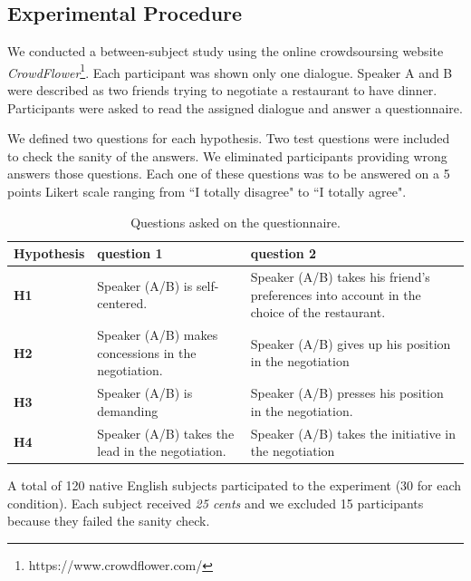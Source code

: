 \documentclass{llncs}
\begin{document}
			
			\subsection{Experimental Procedure}
			
			We conducted a between-subject study using the online crowdsoursing website \emph{CrowdFlower}\footnote{https://www.crowdflower.com/}. 
			Each participant was shown only one dialogue. Speaker A and B were described as two friends trying to negotiate a restaurant to have dinner. %
			Participants were asked to read the assigned dialogue and answer a questionnaire. 
			
			We defined two questions for each hypothesis. Two test questions were included to check the	sanity of the answers. We eliminated participants providing wrong answers those questions. Each one of these questions was to be answered on a 5 points Likert scale ranging from ``I totally disagree" to ``I totally agree".
			
			\begin{table}[t]
				{\scriptsize
					\begin{tabular}{|p{1.75cm}|p{5cm}|p{5.5cm}|}
						\hline
						Hypothesis &question 1& question 2 \\
						\hline
						\textbf{H1} &Speaker (A/B) is self-centered. &Speaker (A/B) takes his friend's preferences into account in the choice of the restaurant.\\
						\hline
						\textbf{H2} &Speaker (A/B) makes concessions in the negotiation.&Speaker (A/B) gives up his position in the negotiation\\
						\hline
						\textbf{H3} & Speaker (A/B) is demanding&Speaker (A/B) presses his position in the negotiation. \\
						\hline
						\textbf{H4} &Speaker (A/B) takes the lead in the negotiation.&Speaker (A/B) takes the initiative in the negotiation \\
						\hline
					\end{tabular}
				}
				\caption{Questions asked on the questionnaire.}
				\label{table:questionnaire}
			\end{table}

			A total of 120 native English subjects participated to the experiment (30 for each condition). Each subject received \textit{25 cents} and we excluded 15 participants because they failed the sanity check.
			
\end{document}
